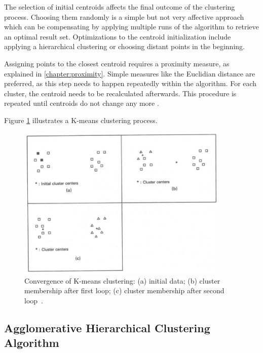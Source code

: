 The selection of initial centroids affects the final outcome of the clustering process. Choosing them randomly is a simple but not very affective approach which can be compensating by applying multiple runs of the algorithm to retrieve an optimal result set. Optimizations to the centroid initialization include applying a hierarchical clustering or choosing distant points in the beginning.

Assigning points to the closest centroid requires a proximity measure, as explained in \ref{chapter:proximity}. Simple measures like the Euclidian distance are preferred, as this step needs to happen repeatedly within the algorithm. For each cluster, the centroid needs to be recalculated afterwards. This procedure is repeated until centroids do not change any more \cite{Jain99clusterreview, Meert06clustermaps}.

Figure \ref{fig:clustering_k-means} illustrates a K-means clustering process.

\begin{figure}[h]
  \begin{center}
    \includegraphics[width=0.9\textwidth]{figures/clustering_k-means.png}
    \caption{Convergence of K-means clustering: (a) initial data; (b) cluster membership after first loop; (c) cluster membership after second loop~\cite[p 99]{Jain88clustering}.}
    \label{fig:clustering_k-means}
  \end{center}
\end{figure}


\subsection{Agglomerative Hierarchical Clustering Algorithm}
\label{chapter:clustering-hierarchical}

